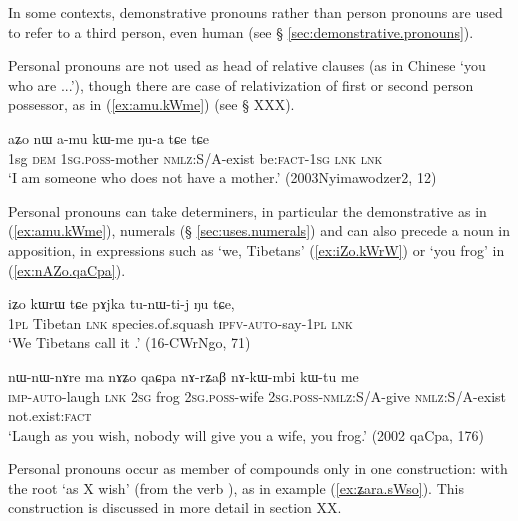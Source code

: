 In some contexts, demonstrative pronouns rather than person pronouns are used to refer to a third person, even human (see § \ref{sec:demonstrative.pronouns}).

Personal pronouns are not used as head of relative clauses (as in Chinese  `you who are ...'), though there are case of relativization of first or second person possessor, as in (\ref{ex:amu.kWme}) (see § XXX).

\begin{exe}
\ex \label{ex:amu.kWme}
\gll aʑo nɯ a-mu kɯ-me ŋu-a tɕe tɕe \\
1sg \textsc{dem} \textsc{1sg.poss}-mother \textsc{nmlz}:S/A-exist be:\textsc{fact-1sg} \textsc{lnk} \textsc{lnk} \\
\glt `I am someone who does not have a mother.' (2003Nyimawodzer2, 12)
\end{exe}

Personal pronouns can take determiners, in particular the demonstrative  as in (\ref{ex:amu.kWme}), numerals (§ \ref{sec:uses.numerals}) and can also precede a noun in apposition, in expressions such as  `we, Tibetans' (\ref{ex:iZo.kWrW}) or  `you frog' in (\ref{ex:nAZo.qaCpa}).

\begin{exe}
\ex \label{ex:iZo.kWrW}
\gll
iʑo kɯrɯ tɕe pɤjka tu-nɯ-ti-j ŋu tɕe, \\
\textsc{1pl} Tibetan \textsc{lnk} species.of.squash \textsc{ipfv}-\textsc{auto}-say-\textsc{1pl} \textsc{lnk} \\
\glt `We Tibetans call it .' (16-CWrNgo, 71)
\end{exe}

\begin{exe}
\ex  \label{ex:nAZo.qaCpa}
\gll  nɯ-nɯ-nɤre ma nɤʑo qaɕpa nɤ-rʑaβ nɤ-kɯ-mbi kɯ-tu me   \\
\textsc{imp-auto}-laugh \textsc{lnk} \textsc{2sg} frog \textsc{2sg.poss}-wife \textsc{2sg.poss}-\textsc{nmlz}:S/A-give \textsc{nmlz}:S/A-exist not.exist:\textsc{fact} \\
\glt `Laugh as you wish, nobody will give you a wife, you frog.'   (2002 qaCpa, 176)
\end{exe} 

Personal pronouns occur as member of compounds only in one construction: with the root  `as X wish' (from the verb ), as in example (\ref{ex:ʑara.sWso}). This construction is discussed in more detail in section XX.

